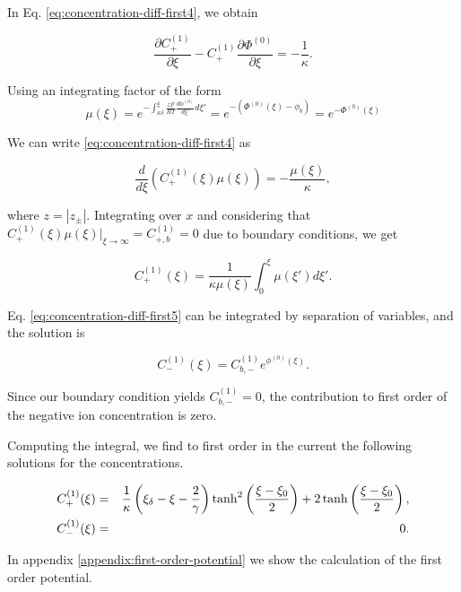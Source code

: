 In Eq. \ref{eq:concentration-diff-first4}, we obtain

$$\frac{\partial C^{(1)}_+}{\partial \xi}-C^{(1)}_+\frac{\partial \Phi^{(0)}}{\partial \xi} = -\frac{1}{\kappa}.$$

Using an integrating factor of the form
$$\mu(\xi)=e^{-\int_{\kappa\delta}^\xi \frac{zF}{RT}\frac{d\phi^{(0)}}{d\xi'}d\xi'}=e^{- (\Phi^{(0)}(\xi)-\phi_b)} = e^{-\Phi^{(0)}(\xi)}$$

We can write \ref{eq:concentration-diff-first4}  as

$$\frac{d}{d\xi}\left(C^{(1)}_+(\xi)\mu(\xi) \right)=-\frac{\mu(\xi)}{\kappa},$$

where $z=|z_\pm|$. Integrating over $x$ and considering that $C^{(1)}_+(\xi)\mu(\xi)\big|_{\xi \rightarrow \infty} = C^{(1)}_{+,b} = 0$ due to boundary conditions, we get

$$C^{(1)}_+(\xi) =\frac{1}{\kappa\mu(\xi)}\int_{0}^{\xi}\mu(\xi')d\xi'.$$

Eq. \ref{eq:concentration-diff-first5} can be integrated by separation of variables, and the solution is 

$$C^{(1)}_-(\xi) = C^{(1)}_{b,-}e^{\phi^{(0)}(\xi)}.$$

Since our boundary condition yields $ C^{(1)}_{b,-} = 0$, the contribution to first order of the negative ion concentration is zero. 

Computing the integral, we find to first order in the current the following solutions for the concentrations.

\begin{eqnarray}
C^{(1)}_+(\xi) &=& \frac{1}{\kappa} \left({\xi_\delta-\xi-\frac{2}{\gamma}}\right)\tanh^2\left({\frac{\xi-\xi_0}{2}}\right)+2\tanh\left({\frac{\xi-\xi_0}{2}}\right),\\
C^{(1)}_-(\xi) &=& 0.
\label{eq:firstordersol}
\end{eqnarray}

In appendix \ref{appendix:first-order-potential} we show the calculation of the first order potential. 





